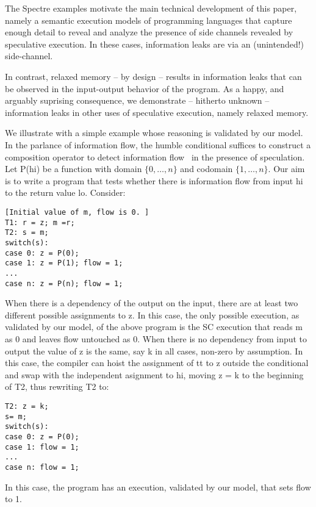 The Spectre examples motivate the main technical development of this
paper, namely a semantic execution models of programming languages
that capture enough detail to reveal and analyze the presence of side
channels revealed by speculative execution. In these cases,
information leaks are via an (unintended!) side-channel.

In contrast, relaxed memory -- by design -- results in information leaks
that can be observed in the input-output behavior of the program. As a
happy, and arguably suprising consequence, we demonstrate -- hitherto
unknown -- information leaks in other uses of speculative execution,
namely relaxed memory.

We illustrate with a simple example whose reasoning is validated by
our model. In the parlance of information flow, the humble conditional
suffices to construct a composition operator to detect information
flow~\cite{???} in the presence of speculation.  Let P(hi) be a
function with domain $\{0, \ldots ,n\}$ and codomain $\{1, \ldots
,n\}$. Our aim is to write a program that tests whether there is
information flow from input hi to the return value lo. Consider:
\begin{verbatim}
[Initial value of m, flow is 0. ]
T1: r = z; m =r;
T2: s = m;
switch(s):
case 0: z = P(0);
case 1: z = P(1); flow = 1;
...
case n: z = P(n); flow = 1;
\end{verbatim}
When there is a dependency of the output on the input, there are at least two different possible
assignments to z. In this case, the only possible execution, as validated by our model, of the above
program is the SC execution that reads m as 0 and leaves flow untouched as 0.
When there is no dependency from input to output the value of z is the same, say k in all cases,
non-zero by assumption. In this case, the compiler can hoist the assignment of tt to z outside the
conditional and swap with the independent asignment to hi, moving z = k to the beginning of T2,
thus rewriting T2 to:
\begin{verbatim}
T2: z = k;
s= m;
switch(s):
case 0: z = P(0);
case 1: flow = 1;
...
case n: flow = 1;
\end{verbatim}
In this case, the program has an execution, validated by our model, that sets flow to 1.
